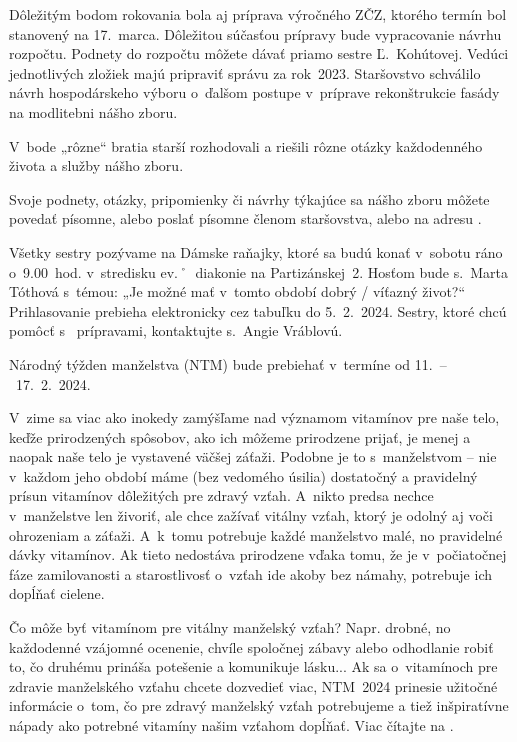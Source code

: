 Dôležitým bodom rokovania bola aj príprava výročného ZČZ, ktorého termín bol stanovený na 17.~marca. Dôležitou súčasťou prípravy bude vypracovanie návrhu rozpočtu. Podnety do rozpočtu môžete dávať priamo sestre Ľ.~Kohútovej. Vedúci jednotlivých zložiek majú pripraviť správu za rok~2023. Staršovstvo schválilo návrh hospodárskeho výboru o~ďalšom postupe v~príprave rekonštrukcie fasády na modlitebni nášho zboru.

V~bode „rôzne“ bratia starší rozhodovali a riešili rôzne otázky každodenného života a služby nášho zboru.

Svoje podnety, otázky, pripomienky či návrhy týkajúce sa nášho zboru môžete povedať písomne, alebo poslať písomne členom staršovstva, alebo na adresu .




Všetky sestry pozývame na Dámske raňajky, ktoré sa budú konať v~sobotu ráno o~9.00~hod. v~stredisku ev.˚~diakonie na Partizánskej~2. Hosťom bude s.~Marta Tóthová s~témou: „Je možné mať v~tomto období dobrý / víťazný život?“ Prihlasovanie prebieha elektronicky cez tabuľku  do 5.~2.~2024. Sestry, ktoré chcú pomôcť s~ prípravami, kontaktujte s.~Angie Vráblovú.
\vfill\break




Národný týžden manželstva (NTM) bude prebiehať v~termíne od 11.~--~17.~2.~2024.

V~zime sa viac ako inokedy zamýšľame nad významom vitamínov pre naše telo, keďže prirodzených spôsobov, ako ich môžeme prirodzene prijať, je menej a naopak naše telo je vystavené väčšej záťaži. Podobne je to s~manželstvom -- nie v~každom jeho období máme (bez vedomého úsilia) dostatočný a pravidelný prísun vitamínov dôležitých pre zdravý vzťah. A~nikto predsa nechce v~manželstve len živoriť, ale chce zažívať vitálny vzťah, ktorý je odolný aj voči ohrozeniam a záťaži. A~k~tomu potrebuje každé manželstvo malé, no pravidelné dávky vitamínov. Ak tieto nedostáva prirodzene vďaka tomu, že je v~počiatočnej fáze zamilovanosti a starostlivosť o~vzťah ide akoby bez námahy, potrebuje ich dopĺňať cielene.

Čo môže byť vitamínom pre vitálny manželský vzťah? Napr. drobné, no každodenné vzájomné ocenenie, chvíle spoločnej zábavy alebo odhodlanie robiť to, čo druhému prináša potešenie a komunikuje lásku... Ak sa o~vitamínoch pre zdravie manželského vzťahu chcete dozvedieť viac, NTM~2024 prinesie užitočné informácie o~tom, čo pre zdravý manželský vzťah potrebujeme a tiež inšpiratívne nápady ako potrebné vitamíny našim vzťahom dopĺňať. Viac čítajte na .


